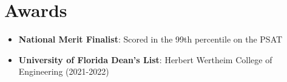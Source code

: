 \documentclass[letterpaper,11pt]{article}
\newcommand{\resumeItemSkills}[2]{
  \item\normalsize{
    \textbf{#1}{: #2 \vspace{-2pt}}
  }
}
\newcommand{\resumeSubItemSkills}[2]{\resumeItemSkills{#1}{#2}\vspace{-4pt}}
\newcommand{\resumeSubHeadingListStartSkillsAwards}{\begin{itemize}[leftmargin=*]}
\newcommand{\resumeSubHeadingListEnd}{\end{itemize}}
\begin{document}
\section{Awards}
  \resumeSubHeadingListStartSkillsAwards
    \resumeSubItemSkills{National Merit Finalist}
      {Scored in the 99th percentile on the PSAT}
    \resumeSubItemSkills{University of Florida Dean's List}
      {Herbert Wertheim College of Engineering (2021-2022)}
  \resumeSubHeadingListEnd
\end{document}
